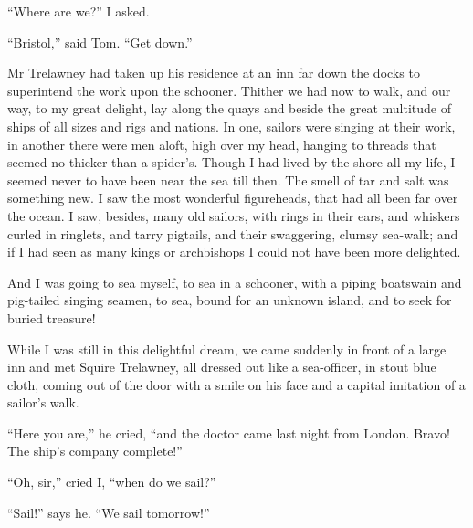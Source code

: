 \enquote{Where are we?} I asked.

\enquote{Bristol,} said Tom. \enquote{Get down.}

Mr Trelawney had taken up his residence at an inn far down the docks to superintend the work upon the schooner. Thither we had now to walk, and our way, to my great delight, lay along the quays and beside the great multitude of ships of all sizes and rigs and nations. In one, sailors were singing at their work, in another there were men aloft, high over my head, hanging to threads that seemed no thicker than a spider’s. Though I had lived by the shore all my life, I seemed never to have been near the sea till then. The smell of tar and salt was something new. I saw the most wonderful figureheads, that had all been far over the ocean. I saw, besides, many old sailors, with rings in their ears, and whiskers curled in ringlets, and tarry pigtails, and their swaggering, clumsy sea-walk; and if I had seen as many kings or archbishops I could not have been more delighted.

And I was going to sea myself, to sea in a schooner, with a piping boatswain and pig-tailed singing seamen, to sea, bound for an unknown island, and to seek for buried treasure!

While I was still in this delightful dream, we came suddenly in front of a large inn and met Squire Trelawney, all dressed out like a sea-officer, in stout blue cloth, coming out of the door with a smile on his face and a capital imitation of a sailor’s walk.

\enquote{Here you are,} he cried, \enquote{and the doctor came last night from London. Bravo! The ship’s company complete!}

\enquote{Oh, sir,} cried I, \enquote{when do we sail?}

\enquote{Sail!} says he. \enquote{We sail tomorrow!}
